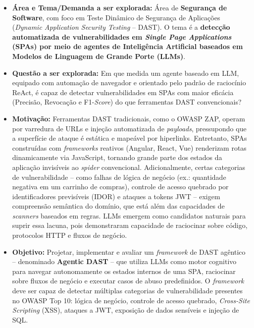 \documentclass[12pt, a4paper]{article}
\begin{document}
\begin{itemize}

  \item \textbf{Área e Tema/Demanda a ser explorada:}
  Área de \textbf{Segurança de Software}, com foco em Teste Dinâmico de Segurança de Aplicações (\textit{Dynamic Application Security Testing} -- DAST).
  O tema é a \textbf{detecção automatizada de vulnerabilidades em \textit{Single Page Applications} (SPAs) por meio de agentes de Inteligência Artificial baseados em Modelos de Linguagem de Grande Porte (LLMs)}.

  \item \textbf{Questão a ser explorada:}
  Em que medida um agente baseado em LLM, equipado com automação de navegador e orientado pelo padrão de raciocínio ReAct, é capaz de detectar vulnerabilidades em SPAs com maior eficácia (Precisão, Revocação e F1-\textit{Score}) do que ferramentas DAST convencionais?

  \item \textbf{Motivação:}
  Ferramentas DAST tradicionais, como o OWASP ZAP, operam por varredura de URLs e injeção automatizada de \textit{payloads}, pressupondo que a superfície de ataque é estática e mapeável por hiperlinks.
  Entretanto, SPAs construídas com \textit{frameworks} reativos (Angular, React, Vue) renderizam rotas dinamicamente via JavaScript, tornando grande parte dos estados da aplicação invisíveis ao \textit{spider} convencional.
  Adicionalmente, certas categorias de vulnerabilidade -- como falhas de lógica de negócio (ex.: quantidade negativa em um carrinho de compras), controle de acesso quebrado por identificadores previsíveis (IDOR) e ataques a tokens JWT -- exigem compreensão semântica do domínio, que está além das capacidades de \textit{scanners} baseados em regras.
  LLMs emergem como candidatos naturais para suprir essa lacuna, pois demonstraram capacidade de raciocinar sobre código, protocolos HTTP e fluxos de negócio.

  \item \textbf{Objetivo:}
  Projetar, implementar e avaliar um \textit{framework} de DAST agêntico -- denominado \textbf{Agentic DAST} -- que utiliza LLMs como motor cognitivo para navegar autonomamente os estados internos de uma SPA, raciocinar sobre fluxos de negócio e executar casos de abuso predefinidos.
  O \textit{framework} deve ser capaz de detectar múltiplas categorias de vulnerabilidade presentes no OWASP Top 10: lógica de negócio, controle de acesso quebrado, \textit{Cross-Site Scripting} (XSS), ataques a JWT, exposição de dados sensíveis e injeção de SQL.


\end{itemize}
\end{document}
